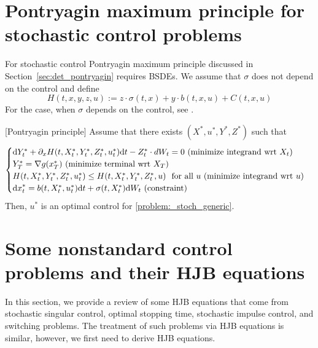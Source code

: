 \documentclass[11pt]{book}
\newcommand{\dd}{\text{\normalfont d}}
\newcommand{\dt}{\text{\normalfont d}t}
\newcommand{\dx}{\text{\normalfont d}x}
\newcommand{\dW}{\text{\normalfont d}W}
\begin{document}
\section{Pontryagin maximum principle for stochastic control problems}\label{sec:stoch_pontryagin}
For stochastic control Pontryagin maximum principle discussed in Section~\ref{sec:det_pontryagin} requires BSDEs. We assume that $\sigma$ does not depend on the control and define 
\[
H(t,x,y,z,u):=z\cdot  \sigma(t,x)+ y\cdot  b(t,x,u)+ C(t,x,u)
\]
For the case, when $\sigma$  depends on the control, see \citet{P90}. 
\begin{thm}\label{thm:pontryagin_stochastic}
    [Pontryagin principle]
    Assume that there exists $(X^*,u^*,Y^*,Z^*)$ such that
    \begin{equation}\label{eqn:pontryagin_stochastic}
    \begin{cases}
        {\dd}Y^*_t+ \partial_x H(t,X^*_t,Y^*_t,Z^*_t,u^*_t){\dt} - Z^*_t\cdot dW_t =0~ (\textrm{minimize integrand wrt $X_t$})\\
        Y^*_T=\nabla g(x^*_T) ~(\textrm{minimize terminal wrt $X_T$})\\
        H(t,X^*_t,Y^*_t,Z^*_t,u^*_t)\le H(t,X^*_t,Y^*_t,Z^*_t,u)~\textrm{ for all } u ~(\textrm{minimize integrand wrt $u$})\\
        {\dx}^*_t = b(t,X^*_t,u^*_t) {\dt} + \sigma(t,X^*_t)\dW_t~(\textrm{constraint})
        \end{cases}
\end{equation}
Then, $u^*$ is an optimal control for \eqref{problem:_stoch_generic}.
\end{thm}
\section{Some nonstandard control problems and their HJB equations}
In this section, we provide a review of some HJB equations that come from stochastic singular control, optimal stopping time, stochastic impulse control, and switching problems. The treatment of such problems via HJB equations is similar, however, we first need to derive HJB equations. 
\end{document}
